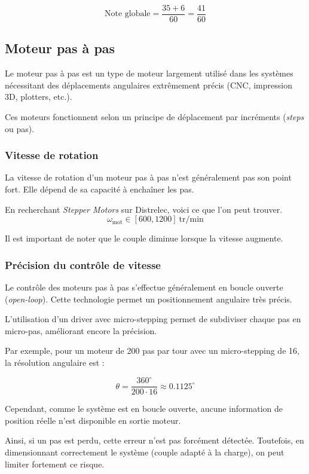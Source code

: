 $$
\text{Note globale}=\frac{35+6}{60}=\frac{41}{60}
$$

\subsection{Moteur pas à pas}
Le moteur pas à pas est un type de moteur largement utilisé dans les systèmes nécessitant des déplacements angulaires extrêmement précis (CNC, impression 3D, plotters, etc.).

Ces moteurs fonctionnent selon un principe de déplacement par incréments (\textit{steps} ou pas).

\subsubsection{Vitesse de rotation}

La vitesse de rotation d'un moteur pas à pas n'est généralement pas son point fort. Elle dépend de sa capacité à enchaîner les pas.

En recherchant \textit{Stepper Motors} sur Distrelec, voici ce que l'on peut trouver.
$$
\omega_{\text{mot}} \in [600, 1200] \ \text{tr/min}
$$

Il est important de noter que le couple diminue lorsque la vitesse augmente.

\subsubsection{Précision du contrôle de vitesse}

Le contrôle des moteurs pas à pas s'effectue généralement en boucle ouverte (\textit{open-loop}). Cette technologie permet un positionnement angulaire très précis.

L'utilisation d'un driver avec micro-stepping permet de subdiviser chaque pas en micro-pas, améliorant encore la précision.

Par exemple, pour un moteur de 200 pas par tour avec un micro-stepping de 16, la résolution angulaire est :

$$
\theta = \frac{360^\circ}{200 \cdot 16} \approx 0.1125^\circ
$$

Cependant, comme le système est en boucle ouverte, aucune information de position réelle n'est disponible en sortie moteur. 

Ainsi, si un pas est perdu, cette erreur n'est pas forcément détectée. Toutefois, en dimensionnant correctement le système (couple adapté à la charge), on peut limiter fortement ce risque.


